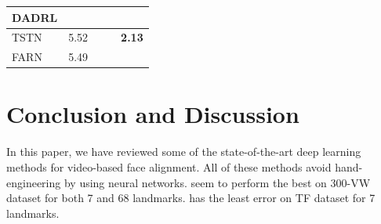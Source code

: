 \documentclass{llncs}
\begin{document}
\begin{table}[]
\begin{tabular}{|l|l|l|l|l|}
DADRL                   &                                                                        &                                                                       &                                                                        &                                                                       \\ \hline
TSTN                    & 5.52                                                                   &                                                                       &                                                                        & \textbf{2.13}                                                         \\ \hline
FARN                    & 5.49                                                                   &                                                                       &                                                                        &                                                                       \\ \hline
\end{tabular}
\label{comparison}
\end{table}



\section{Conclusion and Discussion}

In this paper, we have reviewed some of the state-of-the-art deep learning methods for video-based face alignment. All of these methods avoid hand-engineering by using neural networks. \cite{rednet} seem to perform the best on 300-VW dataset for both 7 and 68 landmarks. \cite{tstn} has the least error on TF dataset for 7 landmarks. 

%

%
%


%
\end{document}
